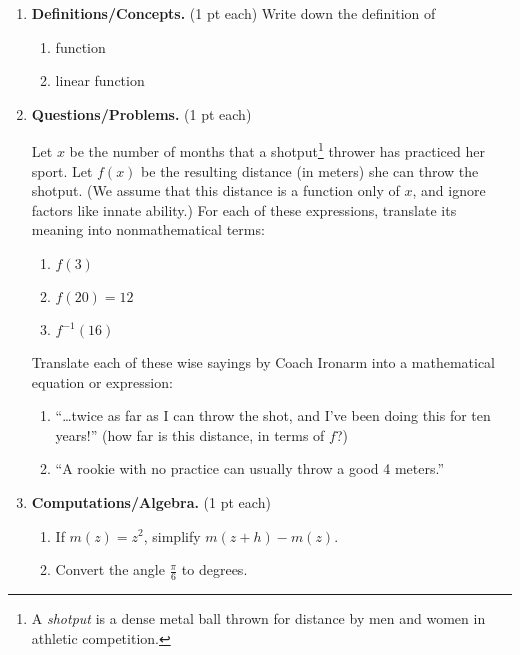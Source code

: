 \documentclass[11pt,letterpaper]{article}
\begin{document}
\begin{enumerate}
\item  \textbf{Definitions/Concepts.} (1 pt each) Write down the definition of
\begin{enumerate} 
\item function 
\vspace{1.5pc}
\item linear function
\vspace{1.5pc}
\end{enumerate}

\item \textbf{Questions/Problems.} (1 pt each) 

Let $x$ be the number of months
that a shotput\footnote{A {\it shotput} is a dense
metal ball
thrown for distance by men and women in athletic
competition.}
thrower has practiced her sport. Let $f(x)$ be the
resulting
distance (in meters) she can throw the shotput. (We
assume that
this distance is a function only of $x$, and ignore
factors like
innate ability.)
For each of these expressions, translate its meaning
into
nonmathematical terms:
\begin{enumerate}
\item $f(3)$ 
\vspace{1.5pc}
\item $f(20) = 12$ 
\vspace{1.5pc}
\item $f^{-1}(16)$ 
\vspace{1.5pc}
\end{enumerate}
\noindent Translate each of these wise sayings by Coach Ironarm
into a
mathematical equation or expression: 
\begin{enumerate}
\item ``\ldots twice as far as I can throw the shot, and I've been doing this for ten years!'' (how far is this distance, in terms of $f$?) 
\vspace{1.5pc}
\item ``A rookie with no practice can usually throw a good 4 meters.'' 
\vspace{1.5pc}
\end{enumerate}

\item \textbf{Computations/Algebra.} (1 pt each) 
\begin{enumerate}
\item If $m(z)=z^2$, simplify $m(z+h)-m(z)$.
\vspace{1.5pc}
\item Convert the angle $\frac{\pi }{6}$ to degrees.
\vspace{1.5pc}
\end{enumerate}

\end{enumerate}
\end{document}
